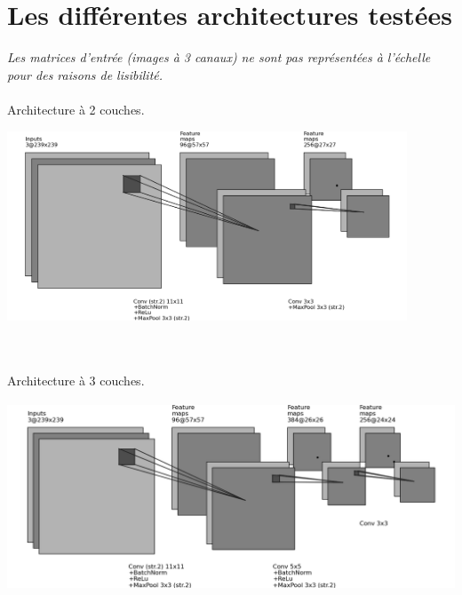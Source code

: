 \documentclass[10pt,twocolumn,letterpaper,french]{article}
\begin{document}
\begin{appendices}
\begin{center}
  \end{center} 
  \clearpage
  \section{Les différentes architectures testées}
  \label{annexe_archis}
  
  
  	\textit{Les matrices d'entrée (images à 3 canaux) ne sont pas représentées à l'échelle pour des raisons de lisibilité.}\\
  	\hspace{1cm}\\

    Architecture à 2 couches.
    \begin{center}
    \includegraphics[height=160pt]{images/archis/convnet_cnn2.png}
    \end{center}
    \hspace{1cm}\\
    \hspace{1cm}\\

    Architecture à 3 couches.
    \begin{center}
    \includegraphics[height=160pt]{images/archis/convnet_cnn3.png}
    \end{center}
    \hspace{1cm}\\
    \hspace{1cm}\\
  

\end{appendices}
\end{document}
